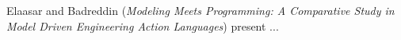 

Elaasar and Badreddin
\cite{isola-2016-elaasar}
({\em Modeling Meets Programming: A Comparative Study in
Model Driven Engineering Action Languages})
present ...

